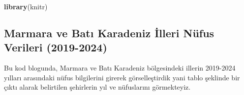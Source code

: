 \documentclass[
]{article}
\newenvironment{Shaded}{\begin{snugshade}}{\end{snugshade}}
\newcommand{\FunctionTok}[1]{\textcolor[rgb]{0.13,0.29,0.53}{\textbf{#1}}}
\newcommand{\NormalTok}[1]{#1}
\begin{document}
\begin{Shaded}
\begin{Highlighting}[]
\FunctionTok{library}\NormalTok{(knitr)}
\end{Highlighting}
\end{Shaded}

\subsection{Marmara ve Batı Karadeniz İlleri Nüfus Verileri
(2019-2024)}\label{marmara-ve-batux131-karadeniz-illeri-nuxfcfus-verileri-2019-2024}

Bu kod blogunda, Marmara ve Batı Karadeniz bölgesindeki illerin
2019-2024 yılları arasındaki nüfus bilgilerini girerek görselleştirdik
yani tablo şeklinde bir çıktı alarak belirtilen şehirlerin yıl ve
nüfuslarını görmekteyiz.
\end{document}
